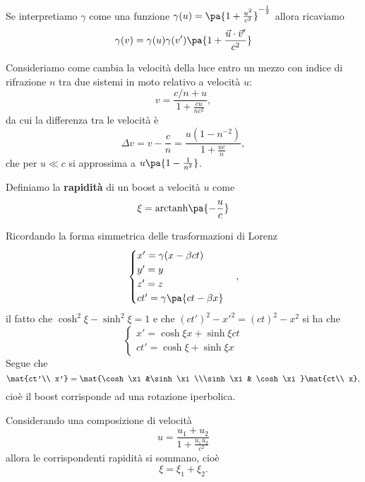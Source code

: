 \begin{remark}
Se interpretiamo $\gamma$ come una funzione $\gamma(u)=\pa{1+\frac{u^2}{c^2}}^{-\frac12}$ allora ricaviamo
\[\gamma(v)=\gamma(u)\gamma(v')\pa{1+\frac{\vec u\cdot \vec v'}{c^2}}\]
\end{remark}


\begin{example}
Consideriamo come cambia la velocit\`a della luce entro un mezzo con indice di rifrazione $n$ tra due sistemi in moto relativo a velocit\`a $u$:
\[v=\frac{c/n+u}{1+\frac{cu}{nc^2}},\]
da cui la differenza tra le velocit\`a \`e
\[\Delta v=v-\frac cn=\frac{u(1-n^{-2})}{1+\frac{uc}n},\]
che per $u\ll c$ si approssima a $u\pa{1-\frac1{n^2}}$.
\end{example}

\begin{definition}[Rapidit\`a]
Definiamo la \textbf{rapidit\`a} di un boost a velocit\`a $u$ come
\[\xi=\mathrm{arctanh}\pa{-\frac uc}\]
\end{definition}
\noindent
Ricordando la forma simmetrica delle trasformazioni di Lorenz
\[\begin{cases}
x'=\gamma (x-\beta ct)\\
y'=y\\
z'=z\\
ct'=\gamma\pa{ct-\beta x}
\end{cases},\]
il fatto che $\cosh^2\xi-\sinh^2\xi=1$ e che $(ct')^2-x'^2=(ct)^2-x^2$ si ha che
\[\begin{cases}
x'=\cosh\xi x+\sinh\xi ct\\
ct'=\cosh \xi +\sinh\xi x
\end{cases}\]
Segue che
\[\mat{ct'\\ x'}=\mat{\cosh \xi &\sinh \xi\\\sinh \xi & \cosh \xi}\mat{ct\\ x},\]
cio\`e il boost corrisponde ad una rotazione iperbolica.

\begin{remark}
Considerando una composizione di velocit\`a 
\[u=\dfrac{u_1+u_2}{1+\frac{u_1u_2}{c^2}}\]
allora le corrispondenti rapidit\`a si sommano, cio\`e
\[\xi=\xi_1+\xi_2.\]
\end{remark}

